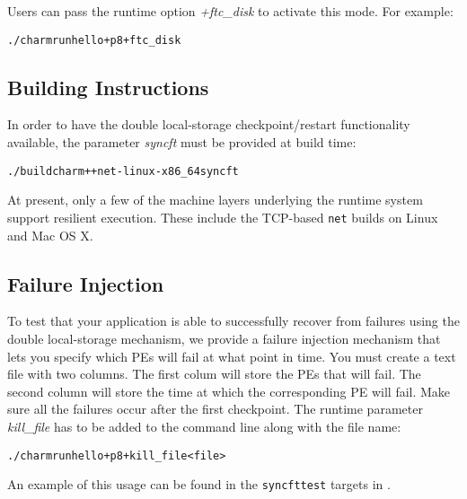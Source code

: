 Users can pass the runtime option {\it +ftc\_disk} to activate this
mode.  For example:

\begin{alltt}
   ./charmrun hello +p8 +ftc_disk
\end{alltt} 

\subsection{Building Instructions}
In order to have the double local-storage checkpoint/restart
functionality available, the parameter \emph{syncft} must be provided
at build time:

\begin{alltt}
   ./build charm++ net-linux-x86_64 syncft
\end{alltt} 

At present, only a few of the machine layers underlying the \charmpp{}
runtime system support resilient execution. These include the
TCP-based \texttt{net} builds on Linux and Mac OS X.

\subsection{Failure Injection}
To test that your application is able to successfully recover from
failures using the double local-storage mechanism, we provide a
failure injection mechanism that lets you specify which PEs will fail
at what point in time. You must create a text file with two
columns. The first colum will store the PEs that will fail. The second
column will store the time at which the corresponding PE will
fail. Make sure all the failures occur after the first checkpoint. The
runtime parameter \emph{kill\_file} has to be added to the command
line along with the file name:

\begin{alltt}
   ./charmrun hello +p8 +kill_file <file>
\end{alltt} 

An example of this usage can be found in the \texttt{syncfttest}
targets in .

